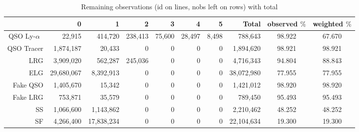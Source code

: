 \documentclass{extarticle}
\def\lya{Ly-$\alpha$\ }
\begin{document}
\begin{table}[H]\begin{center}
\begin{tabular}{r|rrrrrrrcc}
	~   &         0 &         1 &       2 &      3 &      4 &     5 &         Total &  observed $\%$ & weighted $\%$ \\ \hline
	QSO \lya   &    22,915 &   414,720 & 238,413 & 75,600 & 28,497 & 8,498 &   788,643 & 98.922 & 67.670\\ 
	QSO Tracer & 1,874,187 &    20,433 &       0 &      0 &      0 &     0 & 1,894,620 & 98.921 & 98.921\\ 
	LRG        & 3,909,020 &   562,287 & 245,036 &      0 &      0 &     0 & 4,716,343 & 94.804 & 88.843\\ 
	ELG        &29,680,067 & 8,392,913 &       0 &      0 &      0 &     0 &38,072,980 & 77.955 & 77.955\\ 
	Fake QSO   & 1,405,670 &    15,342 &       0 &      0 &      0 &     0 & 1,421,012 & 98.920 & 98.920\\ 
	Fake LRG   &   753,871 &    35,579 &       0 &      0 &      0 &     0 &   789,450 & 95.493 & 95.493\\ 
	SS         & 1,066,600 & 1,143,862 &       0 &      0 &      0 &     0 & 2,210,462 & 48.252 & 48.252\\ 
	SF         & 4,266,400 &17,838,234 &       0 &      0 &      0 &     0 &22,104,634 & 19.300 & 19.300\\ 
\end{tabular}
\caption{Remaining observations (id on lines, nobs left on rows) with total}
\label{tab:full14k}
\end{center}
 \end{table}
\end{document}
